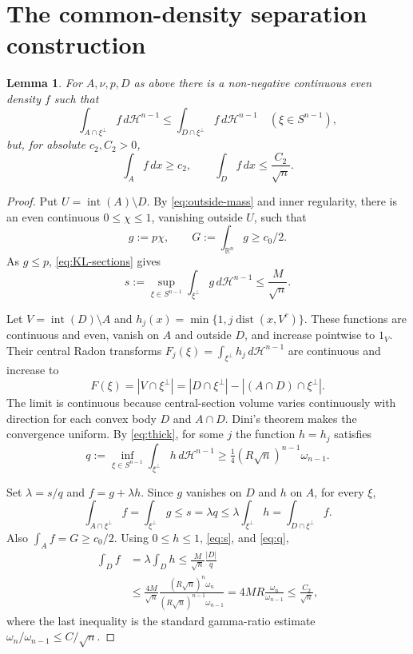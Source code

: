 \documentclass[11pt]{article}
\newtheorem{lemma}[theorem]{Lemma}
\newcommand{\R}{\mathbb R}
\newcommand{\cH}{\mathcal H}
\begin{document}
\section{The common-density separation construction}
\begin{lemma}\label{lem:separate}
For $A,\nu,p,D$ as above there is a non-negative continuous even density $f$
such that
\begin{equation}\label{eq:constructed-sections}
 \int_{A\cap\xi^\perp}f\,d\cH^{n-1}\leq
 \int_{D\cap\xi^\perp}f\,d\cH^{n-1}\quad(\xi\in S^{n-1}),
\end{equation}
but, for absolute $c_2,C_2>0$,
\begin{equation}\label{eq:constructed-ratio}
 \int_Af\,dx\geq c_2,\qquad \int_Df\,dx\leq\frac{C_2}{\sqrt n}.
\end{equation}
\end{lemma}
\begin{proof}
Put $U=\operatorname{int}(A)\setminus D$. By \eqref{eq:outside-mass} and inner
regularity, there is an even continuous $0\leq\chi\leq1$, vanishing outside
$U$, such that
\begin{equation}\label{eq:g-mass}
 g:=p\chi,\qquad G:=\int_{\R^n}g\geq c_0/2.
\end{equation}
As $g\leq p$, \eqref{eq:KL-sections} gives
\begin{equation}\label{eq:s}
 s:=\sup_{\xi\in S^{n-1}}\int_{\xi^\perp}g\,d\cH^{n-1}
 \leq\frac{M}{\sqrt n}.
\end{equation}

Let $V=\operatorname{int}(D)\setminus A$ and
$h_j(x)=\min\{1,j\operatorname{dist}(x,V^c)\}$. These functions are
continuous and even, vanish on $A$ and outside $D$, and increase pointwise to
$1_V$. Their central Radon transforms
$F_j(\xi)=\int_{\xi^\perp}h_j\,d\cH^{n-1}$ are continuous and increase to
\[
 F(\xi)=|V\cap\xi^\perp|=|D\cap\xi^\perp|-|(A\cap D)\cap\xi^\perp|.
\]
The limit is continuous because central-section volume varies continuously
with direction for each convex body $D$ and $A\cap D$. Dini's theorem makes
the convergence uniform. By \eqref{eq:thick}, for some $j$ the function
$h=h_j$ satisfies
\begin{equation}\label{eq:q}
 q:=\inf_{\xi\in S^{n-1}}\int_{\xi^\perp}h\,d\cH^{n-1}
 \geq\tfrac14(R\sqrt n)^{n-1}\omega_{n-1}.
\end{equation}

Set $\lambda=s/q$ and $f=g+\lambda h$. Since $g$ vanishes on $D$ and $h$ on
$A$, for every $\xi$,
\[
 \int_{A\cap\xi^\perp}f=\int_{\xi^\perp}g
 \leq s=\lambda q\leq\lambda\int_{\xi^\perp}h
 =\int_{D\cap\xi^\perp}f.
\]
Also $\int_Af=G\geq c_0/2$. Using $0\leq h\leq1$,
\eqref{eq:s}, and \eqref{eq:q},
\begin{align*}
 \int_Df&=\lambda\int_Dh\leq\frac{M}{\sqrt n}\frac{|D|}{q}\\
 &\leq\frac{4M}{\sqrt n}
 \frac{(R\sqrt n)^n\omega_n}{(R\sqrt n)^{n-1}\omega_{n-1}}
 =4MR\frac{\omega_n}{\omega_{n-1}}\leq\frac{C_2}{\sqrt n},
\end{align*}
where the last inequality is the standard gamma-ratio estimate
$\omega_n/\omega_{n-1}\leq C/\sqrt n$.
\end{proof}
\end{document}

